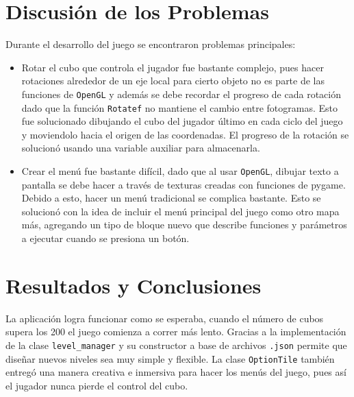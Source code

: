 \documentclass[letterpaper,11pt]{article} %
\begin{document}
\section{Discusión de los Problemas}
	Durante el desarrollo del juego se encontraron problemas principales:
	\begin{itemize}
		\item Rotar el cubo que controla el jugador fue bastante complejo, pues hacer rotaciones alrededor de un eje local para cierto objeto no es parte de las funciones de \verb!OpenGL! y además se debe recordar el progreso de cada rotación dado que la función \verb!Rotatef! no mantiene el cambio entre fotogramas. Esto fue solucionado dibujando el cubo del jugador último en cada ciclo del juego y moviendolo hacia el origen de las coordenadas. El progreso de la rotación se solucionó usando una variable auxiliar para almacenarla.
		\item Crear el menú fue bastante difícil, dado que al usar \verb!OpenGL!, dibujar texto a pantalla se debe hacer a través de texturas creadas con funciones de pygame. Debido a esto, hacer un menú tradicional se complica bastante. Esto se solucionó con la idea de incluir el menú principal del juego como otro mapa más, agregando un tipo de bloque nuevo que describe funciones y parámetros a ejecutar cuando se presiona un botón.
	\end{itemize}

\section{Resultados y Conclusiones}
	La aplicación logra funcionar como se esperaba, cuando el número de cubos supera los 200 el juego comienza a correr más lento. Gracias a la implementación de la clase \verb!level_manager! y su constructor a base de archivos \verb!.json! permite que diseñar nuevos niveles sea muy simple y flexible. La clase \verb!OptionTile! también entregó una manera creativa e inmersiva para hacer los menús del juego, pues así el jugador nunca pierde el control del cubo. 

\end{document}
